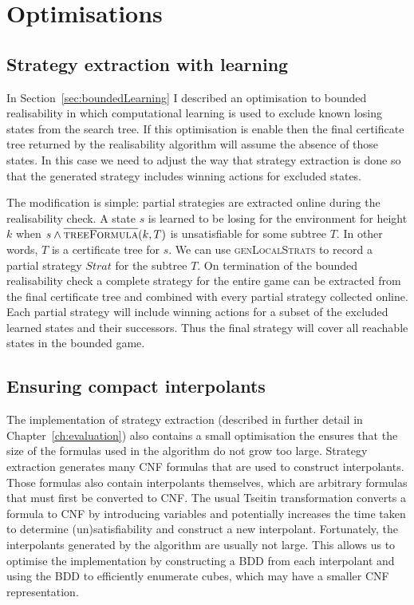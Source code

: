 \section{Optimisations}

\subsection{Strategy extraction with learning}

In Section~\ref{sec:boundedLearning} I described an optimisation to bounded realisability in which computational learning is used to exclude known losing states from the search tree. If this optimisation is enable then the final certificate tree returned by the realisability algorithm will assume the absence of those states. In this case we need to adjust the way that strategy extraction is done so that the generated strategy includes winning actions for excluded states. 

The modification is simple: partial strategies are extracted online during the realisability check. A state $s$ is learned to be losing for the environment for height $k$ when $s \land \textsc{$\overline{\mbox{treeFormula}}$}(k, T)$ is unsatisfiable for some subtree $T$. In other words, $T$ is a certificate tree for $s$. We can use \textsc{genLocalStrats} to record a partial strategy $Strat$ for the subtree $T$. On termination of the bounded realisability check a complete strategy for the entire game can be extracted from the final certificate tree and combined with every partial strategy collected online. Each partial strategy will include winning actions for a subset of the excluded learned states and their successors. Thus the final strategy will cover all reachable states in the bounded game.

\subsection{Ensuring compact interpolants}

The implementation of strategy extraction (described in further detail in Chapter~\ref{ch:evaluation}) also contains a small optimisation the ensures that the size of the formulas used in the algorithm do not grow too large. Strategy extraction generates many CNF formulas that are used to construct interpolants. Those formulas also contain interpolants themselves, which are arbitrary formulas that must first be converted to CNF. The usual Tseitin transformation converts a formula to CNF by introducing variables and potentially increases the time taken to determine (un)satisfiability and construct a new interpolant. Fortunately, the interpolants generated by the algorithm are usually not large. This allows us to optimise the implementation by constructing a BDD from each interpolant and using the BDD to efficiently enumerate cubes, which may have a smaller CNF representation. 

